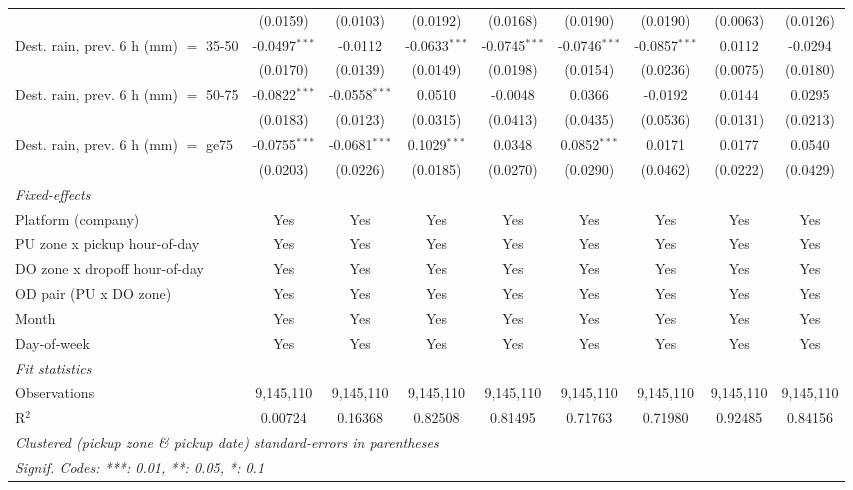 \begin{tabular}{lcccccccc}
    & (0.0159) & (0.0103) & (0.0192) & (0.0168) & (0.0190) & (0.0190) & (0.0063) & (0.0126)\\
   Dest. rain, prev. 6 h (mm) $=$ 35-50 & -0.0497$^{***}$ & -0.0112 & -0.0633$^{***}$ & -0.0745$^{***}$ & -0.0746$^{***}$ & -0.0857$^{***}$ & 0.0112 & -0.0294\\
    & (0.0170) & (0.0139) & (0.0149) & (0.0198) & (0.0154) & (0.0236) & (0.0075) & (0.0180)\\
   Dest. rain, prev. 6 h (mm) $=$ 50-75 & -0.0822$^{***}$ & -0.0558$^{***}$ & 0.0510 & -0.0048 & 0.0366 & -0.0192 & 0.0144 & 0.0295\\
    & (0.0183) & (0.0123) & (0.0315) & (0.0413) & (0.0435) & (0.0536) & (0.0131) & (0.0213)\\
   Dest. rain, prev. 6 h (mm) $=$ ge75 & -0.0755$^{***}$ & -0.0681$^{***}$ & 0.1029$^{***}$ & 0.0348 & 0.0852$^{***}$ & 0.0171 & 0.0177 & 0.0540\\
    & (0.0203) & (0.0226) & (0.0185) & (0.0270) & (0.0290) & (0.0462) & (0.0222) & (0.0429)\\
   \midrule
   \emph{Fixed-effects}\\
   Platform (company) & Yes & Yes & Yes & Yes & Yes & Yes & Yes & Yes\\
   PU zone x pickup hour-of-day & Yes & Yes & Yes & Yes & Yes & Yes & Yes & Yes\\
   DO zone x dropoff hour-of-day & Yes & Yes & Yes & Yes & Yes & Yes & Yes & Yes\\
   OD pair (PU x DO zone) & Yes & Yes & Yes & Yes & Yes & Yes & Yes & Yes\\
   Month & Yes & Yes & Yes & Yes & Yes & Yes & Yes & Yes\\
   Day-of-week & Yes & Yes & Yes & Yes & Yes & Yes & Yes & Yes\\
   \midrule
   \emph{Fit statistics}\\
   Observations & 9,145,110 & 9,145,110 & 9,145,110 & 9,145,110 & 9,145,110 & 9,145,110 & 9,145,110 & 9,145,110\\
   R$^2$ & 0.00724 & 0.16368 & 0.82508 & 0.81495 & 0.71763 & 0.71980 & 0.92485 & 0.84156\\
   \midrule \midrule
   \multicolumn{9}{l}{\emph{Clustered (pickup zone \& pickup date) standard-errors in parentheses}}\\
   \multicolumn{9}{l}{\emph{Signif. Codes: ***: 0.01, **: 0.05, *: 0.1}}\\
\end{tabular}
 
